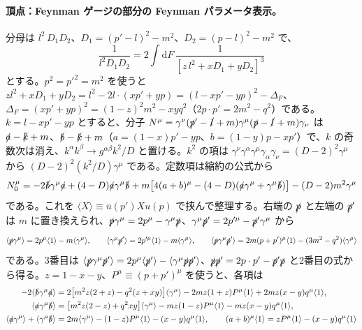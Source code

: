 \documentclass[a4paper,10pt]{ltjsarticle}
\newcommand{\dd}{\mathrm{d}}
\newcommand{\sw}[1]{\langle #1\rangle}
\begin{document}
\paragraph{頂点：Feynman ゲージの部分の Feynman パラメータ表示。}分母は $l^2\,D_1D_2$、$D_1=(p'-l)^2-m^2$、$D_2=(p-l)^2-m^2$ で、
\begin{equation*}
\frac{1}{l^2D_1D_2}=2\int\dd F\,\frac{1}{[z\,l^2+xD_1+yD_2]^3}
\end{equation*}
とする。$p^2=p'^2=m^2$ を使うと $zl^2+xD_1+yD_2=l^2-2l\cdot(xp'+yp)=(l-xp'-yp)^2-\Delta_F$、$\Delta_F=(xp'+yp)^2=(1-z)^2m^2-xyq^2$（$2p\cdot p'=2m^2-q^2$）である。$k=l-xp'-yp$ とすると、分子 $N^\mu=\gamma^\nu(\slashed p'-\slashed l+m)\gamma^\mu(\slashed p-\slashed l+m)\gamma_\nu$ は $\slashed a-\slashed k+m$、$\slashed b-\slashed k+m$（$a=(1-x)p'-yp$、$b=(1-y)p-xp'$）で、$k$ の奇数次は消え、$k^\alpha k^\beta\to g^{\alpha\beta}k^2/D$ と置ける。$k^2$ の項は $\gamma^\nu\gamma^\alpha\gamma^\mu\gamma_\alpha\gamma_\nu=(D-2)^2\gamma^\mu$ から $(D-2)^2(k^2/D)\gamma^\mu$ である。定数項は縮約の公式から
\begin{equation*}
N_0^\mu=-2\slashed b\gamma^\mu\slashed a+(4-D)\slashed a\gamma^\mu\slashed b+m\bigl[4(a+b)^\mu-(4-D)(\slashed a\gamma^\mu+\gamma^\mu\slashed b)\bigr]-(D-2)m^2\gamma^\mu
\end{equation*}
である。これを $\sw{X}\equiv\bar u(p')Xu(p)$ で挟んで整理する。右端の $\slashed p$ と左端の $\slashed p'$ は $m$ に置き換えられ、$\slashed p\gamma^\mu=2p^\mu-\gamma^\mu\slashed p$、$\gamma^\mu\slashed p'=2p'^\mu-\slashed p'\gamma^\mu$ から
\begin{equation*}
\sw{\slashed p\gamma^\mu}=2p^\mu\sw1-m\sw{\gamma^\mu},\qquad
\sw{\gamma^\mu\slashed p'}=2p'^\mu\sw1-m\sw{\gamma^\mu},\qquad
\sw{\slashed p\gamma^\mu\slashed p'}=2m(p+p')^\mu\sw1-(3m^2-q^2)\sw{\gamma^\mu}
\end{equation*}
である。3番目は $\sw{\slashed p\gamma^\mu\slashed p'}=2p^\mu\sw{\slashed p'}-\sw{\gamma^\mu\slashed p\slashed p'}$、$\slashed p\slashed p'=2p\cdot p'-\slashed p'\slashed p$ と2番目の式から得る。$z=1-x-y$、$P^\mu\equiv(p+p')^\mu$ を使うと、各項は
\begin{equation*}
\begin{aligned}
-2\sw{\slashed b\gamma^\mu\slashed a}&=2\bigl[m^2z(2+z)-q^2(z+xy)\bigr]\sw{\gamma^\mu}-2mz(1+z)P^\mu\sw1+2mz(x-y)q^\mu\sw1,\\
\sw{\slashed a\gamma^\mu\slashed b}&=\bigl[m^2z(2-z)+q^2xy\bigr]\sw{\gamma^\mu}-mz(1-z)P^\mu\sw1-mz(x-y)q^\mu\sw1,\\
\sw{\slashed a\gamma^\mu}+\sw{\gamma^\mu\slashed b}&=2m\sw{\gamma^\mu}-(1-z)P^\mu\sw1-(x-y)q^\mu\sw1,\qquad
(a+b)^\mu\sw1=zP^\mu\sw1-(x-y)q^\mu\sw1
\end{aligned}
\end{equation*}
\end{document}
